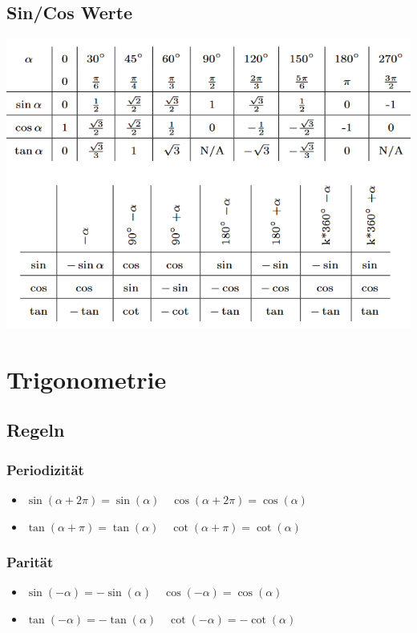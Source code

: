 \documentclass[8pt]{article}
\begin{document}
\begin{multicols*}{3}
\subsection{Sin/Cos Werte}
\begin{center}
\includegraphics[scale=0.4]{values.png}
\end{center}


\section{Trigonometrie}

\subsection{Regeln}
\subsubsection{Periodizität}
\begin{itemize}
 \item $\sin(\alpha + 2 \pi) = \sin(\alpha) \quad \cos(\alpha + 2 \pi) = \cos(\alpha)$
 \item $\tan(\alpha + \pi) = \tan(\alpha) \quad \cot(\alpha + \pi) = \cot(\alpha)$
\end{itemize}

\subsubsection{Parität}
\begin{itemize}
 \item $\sin(-\alpha) = - \sin(\alpha) \quad \cos(-\alpha) = \cos(\alpha)$
 \item $\tan(-\alpha) = - \tan(\alpha) \quad \cot(-\alpha) = - \cot(\alpha)$
\end{itemize}


\end{multicols*}
\end{document}

